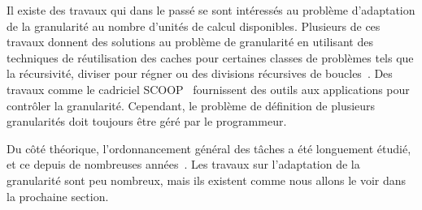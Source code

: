 Il existe des travaux qui dans le passé se sont intéressés au problème d'adaptation de la granularité au nombre d'unités de calcul disponibles.
%
Plusieurs de ces travaux donnent des solutions au problème de granularité en utilisant des techniques de réutilisation des caches pour certaines classes de problèmes tels que la récursivité, diviser pour régner ou des divisions récursives de boucles~\cite{unifieddataflow,Intel_TBB,Cilk,xkaapi,taskscomparison}.
%
Des travaux comme le cadriciel SCOOP~\cite{scoopp} fournissent des outils aux applications pour contrôler la granularité.
%
Cependant, le problème de définition de plusieurs granularités doit toujours être géré par le programmeur.

Du côté théorique, l'ordonnancement général des tâches a été longuement étudié, et ce depuis de nombreuses années~\cite{Khan94acomparison,heft}.
%
Les travaux sur l'adaptation de la granularité sont peu nombreux, mais ils existent comme nous allons le voir dans la prochaine section.
